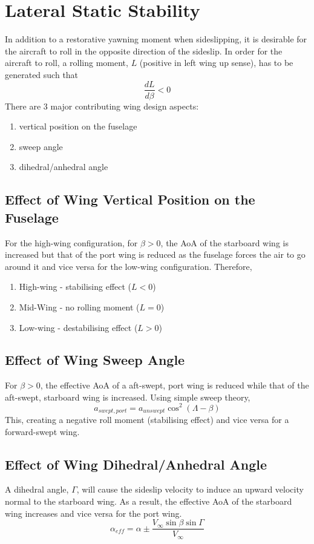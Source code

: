 \section{Lateral Static Stability}
In addition to a restorative yawning moment when sideslipping, it is desirable for the aircraft to roll in the opposite direction of the sideslip. In order for the aircraft to roll, a rolling moment, $L$ (positive in left wing up sense), has to be generated such that
\begin{equation}
  \frac{dL}{d\beta} < 0
\end{equation}
There are 3 major contributing wing design aspects:
\begin{enumerate}
  \item vertical position on the fuselage
  \item sweep angle
  \item dihedral/anhedral angle
\end{enumerate}
\subsection{Effect of Wing Vertical Position on the Fuselage}
For the high-wing configuration, for $\beta>0$, the AoA of the starboard wing is increased but that of the port wing is reduced as the fuselage forces the air to go around it and vice versa for the low-wing configuration. Therefore,
\begin{enumerate}
  \item High-wing - stabilising effect ($L < 0$)
  \item Mid-Wing  - no rolling moment ($L = 0$)
  \item Low-wing  - destabilising effect ($L > 0$)
\end{enumerate}
\subsection{Effect of Wing Sweep Angle}
For $\beta>0$, the effective AoA of a aft-swept, port wing is reduced while that of the aft-swept, starboard wing is increased. Using simple sweep theory,
\begin{equation}
  a_{swept,port} = a_{unswept}\cos^2(\Lambda - \beta)
\end{equation}
This, creating a negative roll moment (stabilising effect) and vice versa for a forward-swept wing.
\subsection{Effect of Wing Dihedral/Anhedral Angle}
A dihedral angle, $\Gamma$, will cause the sideslip velocity to induce an upward velocity normal to the starboard wing. As a result, the effective AoA of the starboard wing increases and vice versa for the port wing.
\begin{equation}
  \alpha_{eff} = \alpha \pm \frac{V_\infty\sin\beta\sin\Gamma}{V_\infty}
\end{equation}
